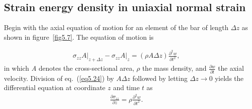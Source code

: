 \documentclass{AeroStructure-ERJohnson}
\begin{document}
\subsection{Strain energy density in uniaxial normal strain}\label{sec5.3.1}

Begin with the axial equation of motion for an element of the bar of length $\Delta z$ as shown in figure~\ref{fig5.7}. The equation of motion is


\begin{align}\label{eq5.24}
\left.\sigma_{z z} A\right|_{z+\Delta z}-\left.\sigma_{z z} A\right|_{z}=(\rho A \Delta z) \frac{\partial^{2} w}{\partial t^{2}},
\end{align}
in which \textit{A} denotes the cross-sectional area, $\rho$ the mass density, and $\frac{\partial w}{\partial t}$ the axial velocity. Division of eq.~(\ref{eq5.24}) by $A\Delta z$ followed by letting $\Delta z \rightarrow 0$ yields the differential equation at coordinate $z$ and time $t$ as
\begin{align}\label{eq5.25}
\frac{\partial \sigma_{z z}}{\partial z}=\rho \frac{\partial^{2} w}{\partial t^{2}}.
\end{align}

\vspace*{-0.6pc}
\end{document}
